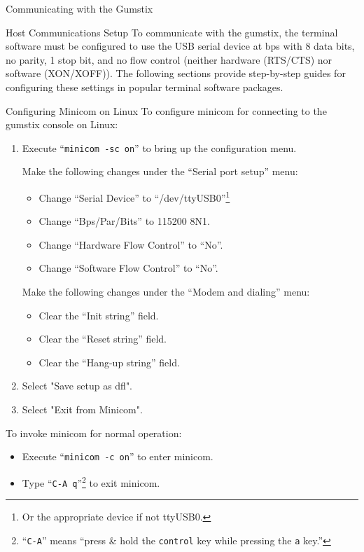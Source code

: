 \documentclass{article}
\begin{document}
\begin{section}{Communicating with the Gumstix}
\begin{subsection}{Host Communications Setup}
	To communicate with the gumstix, the terminal software must be
	configured to use the USB serial device at \unit[115200]{bps}
	with 8 data bits, no parity, 1 stop bit, and no flow control
	(neither hardware (RTS/CTS) nor software (XON/XOFF)).  The
	following sections provide step-by-step guides for configuring
	these settings in popular terminal software packages.

	\begin{subsubsection}{Configuring Minicom on Linux} To
	configure minicom for connecting to the gumstix console on
	Linux:
	\begin{enumerate} 
	\item Execute ``\verb|minicom -sc on|'' to bring up the configuration menu.

		\begin{item}
						Make the following changes under the ``Serial port setup'' menu:
						\begin{itemize}
							\item Change ``Serial Device'' to ``/dev/ttyUSB0''\footnote{Or the
							      appropriate device if not ttyUSB0.}
							\item Change ``Bps/Par/Bits'' to 115200 8N1.
							\item Change ``Hardware Flow Control'' to ``No''.
							\item Change ``Software Flow Control'' to ``No''.
						\end{itemize}
					\end{item}

					\begin{item}
						Make the following changes under the ``Modem and dialing'' menu:
						\begin{itemize}
							\item Clear the ``Init string'' field.
							\item Clear the ``Reset string'' field.
							\item Clear the ``Hang-up string'' field.
						\end{itemize}
					\end{item}

					\item Select "Save setup as dfl".
					\item Select "Exit from Minicom".
				\end{enumerate}
				To invoke minicom for normal operation:
				\begin{itemize}
					\item Execute ``\verb|minicom -c on|'' to enter minicom.
					\item Type ``\verb|C-A q|''\footnote{``\texttt{C-A}'' means ``press \& hold
					      the \texttt{control} key while pressing the \texttt{a} key.''} to exit
					      minicom.
				\end{itemize}
			\end{subsubsection}


\end{subsection}
\end{section}
\end{document}
